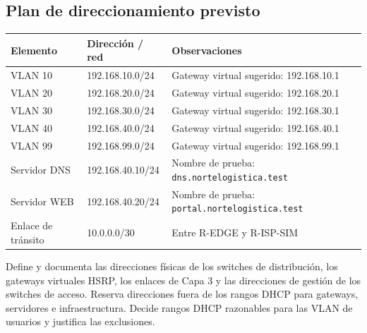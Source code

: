 \documentclass[12pt,a4paper]{article}
\begin{document}
\subsection{Plan de direccionamiento previsto}
\begin{longtable}{p{3.1cm}p{3.0cm}p{6.9cm}}
\toprule
\textbf{Elemento} & \textbf{Dirección / red} & \textbf{Observaciones} \\
\midrule
VLAN 10 & 192.168.10.0/24 & Gateway virtual sugerido: 192.168.10.1 \\
VLAN 20 & 192.168.20.0/24 & Gateway virtual sugerido: 192.168.20.1 \\
VLAN 30 & 192.168.30.0/24 & Gateway virtual sugerido: 192.168.30.1 \\
VLAN 40 & 192.168.40.0/24 & Gateway virtual sugerido: 192.168.40.1 \\
VLAN 99 & 192.168.99.0/24 & Gateway virtual sugerido: 192.168.99.1 \\
Servidor DNS & 192.168.40.10/24 & Nombre de prueba: \texttt{dns.nortelogistica.test} \\
Servidor WEB & 192.168.40.20/24 & Nombre de prueba: \texttt{portal.nortelogistica.test} \\
Enlace de tránsito & 10.0.0.0/30 & Entre R-EDGE y R-ISP-SIM \\
\bottomrule
\end{longtable}

Define y documenta las direcciones físicas de los switches de distribución, los gateways virtuales HSRP, los enlaces de Capa 3 y las direcciones de gestión de los switches de acceso. Reserva direcciones fuera de los rangos DHCP para gateways, servidores e infraestructura. Decide rangos DHCP razonables para las VLAN de usuarios y justifica las exclusiones.
\end{document}
